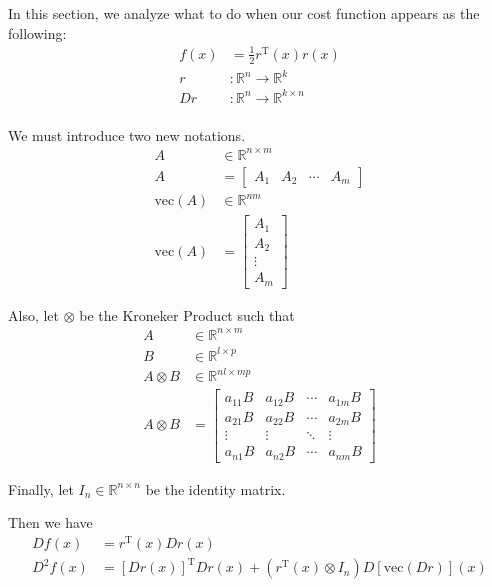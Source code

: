 \documentclass{article}
\begin{document}
In this section, we analyze what to do when our cost function appears as the following:
\begin{align}
    f(x) &= \frac{1}{2} r^\mathrm{T}(x) r(x) \\
    r &: \mathbb{R}^n \rightarrow \mathbb{R}^k \\
    Dr &: \mathbb{R}^n \rightarrow \mathbb{R}^{k \times n} \\
\end{align}

We must introduce two new notations.
\begin{align}
    A &\in \mathbb{R}^{n \times m} \\
    A &= \begin{bmatrix}
        A_1 & A_2 & \cdots & A_m
    \end{bmatrix} \\
    \mathrm{vec}(A) &\in \mathbb{R}^{nm} \\
    \mathrm{vec}(A) &= \begin{bmatrix}
        A_1 \\
        A_2 \\
        \vdots \\
        A_m
    \end{bmatrix}
\end{align}

Also, let $\otimes$ be the Kroneker Product such that
\begin{align}
    A &\in \mathbb{R}^{n \times m} \\
    B &\in \mathbb{R}^{l \times p} \\
    A \otimes B &\in \mathbb{R}^{nl \times mp} \\
    A \otimes B &= \begin{bmatrix}
        a_{11} B & a_{12} B & \cdots & a_{1m} B \\
        a_{21} B & a_{22} B & \cdots & a_{2m} B \\
        \vdots & \vdots & \ddots & \vdots \\
        a_{n1} B & a_{n2} B & \cdots & a_{nm} B
    \end{bmatrix}
\end{align}

Finally, let $I_n \in \mathbb{R}^{n \times n}$ be the identity matrix.

Then we have
\begin{align}
    Df(x) &= r^\mathrm{T}(x) Dr(x) \\
    D^2 f(x) &= \left[ Dr(x) \right]^\mathrm{T} Dr(x) + \left( r^\mathrm{T} (x) \otimes I_n \right) D \left[ \mathrm{vec} \left( Dr \right) \right](x)
\end{align}
\end{document}
